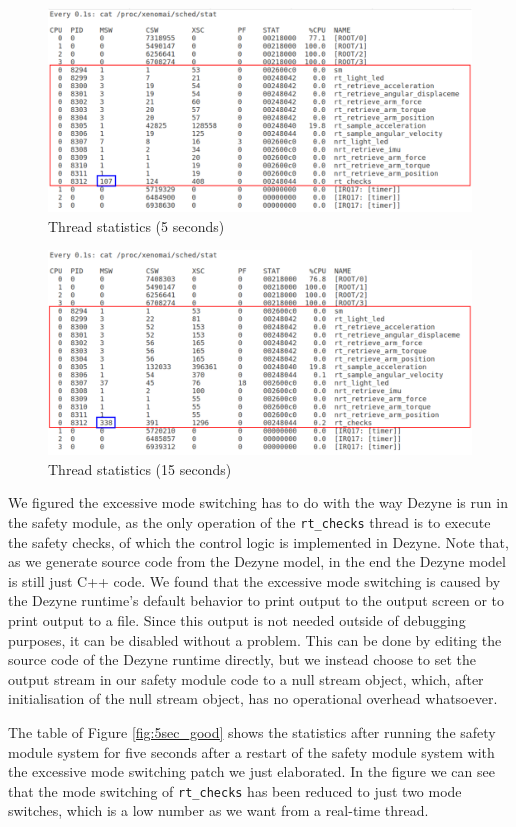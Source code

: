 \documentclass[12pt]{scrreprt}
\begin{document}
\begin{figure}[H]
    \centering
    \includegraphics[width=\textwidth]{Figures/results/stat/5sec_bad_with_frames.png}
    \caption{Thread statistics (5 seconds)}
    \label{fig:5sec_bad}
\end{figure}

\begin{figure}[H]
    \centering
    \includegraphics[width=\textwidth]{Figures/results/stat/15sec_bad_with_frames.png}
    \caption{Thread statistics (15 seconds)}
    \label{fig:15sec_bad}
\end{figure}

We figured the excessive mode switching has to do with the way Dezyne is run in the safety module, as the only operation of the \texttt{rt\_checks} thread is to execute the safety checks, of which the control logic is implemented in Dezyne. Note that, as we generate source code from the Dezyne model, in the end the Dezyne model is still just C++ code. We found that the excessive mode switching is caused by the Dezyne runtime's default behavior to print output to the output screen or to print output to a file. Since this output is not needed outside of debugging purposes, it can be disabled without a problem. This can be done by editing the source code of the Dezyne runtime directly, but we instead choose to set the output stream in our safety module code to a null stream object, which, after initialisation of the null stream object, has no operational overhead whatsoever.
\par
The table of Figure \ref{fig:5sec_good} shows the statistics after running the safety module system for five seconds after a restart of the safety module system with the excessive mode switching patch we just elaborated. In the figure we can see that the mode switching of \texttt{rt\_checks} has been reduced to just two mode switches, which is a low number as we want from a real-time thread. 
\end{document}
